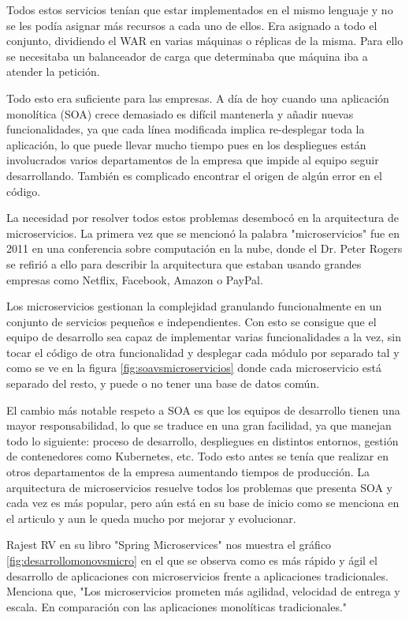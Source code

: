 \documentclass[12pt]{report} %
\begin{document}
Todos estos servicios tenían que estar implementados en el mismo lenguaje y no se les podía asignar más recursos a cada uno de ellos. Era asignado a todo el conjunto, dividiendo el WAR en varias máquinas o réplicas de la misma. Para ello se necesitaba un balanceador de carga que determinaba que máquina iba a atender la petición.


Todo esto era suficiente para las empresas. A día de hoy cuando una aplicación monolítica (SOA) crece demasiado es difícil mantenerla y añadir nuevas funcionalidades, ya que cada línea modificada implica re-desplegar toda la aplicación, lo que puede llevar mucho tiempo pues en los despliegues están involucrados varios departamentos de la empresa que impide al equipo seguir desarrollando. También es complicado encontrar el origen de algún error en el código.

La necesidad por resolver todos estos problemas desembocó en la arquitectura de microservicios. La primera vez que se mencionó la palabra "microservicios" fue en 2011 en una conferencia sobre computación en la nube, donde el Dr. Peter Rogers\cite{breveHistoria} se refirió a ello para describir la arquitectura que estaban usando grandes empresas como Netflix, Facebook, Amazon o PayPal. 

Los microservicios gestionan la complejidad granulando funcionalmente en un conjunto de servicios pequeños e independientes. Con esto se consigue que el equipo de desarrollo sea capaz de implementar varias funcionalidades a la vez, sin tocar el código de otra  funcionalidad y desplegar cada módulo por separado tal y como se ve en la figura \ref{fig:soavsmicroservicios} donde cada microservicio está separado del resto, y puede o no tener una base de datos común.

El cambio más notable respeto a SOA es que los equipos de desarrollo tienen una mayor responsabilidad, lo que se traduce en una gran facilidad, ya que manejan todo lo siguiente:  proceso de desarrollo, despliegues en distintos entornos, gestión de contenedores como Kubernetes, etc. Todo esto antes se tenía que realizar en otros departamentos de la empresa aumentando tiempos de producción. La arquitectura de microservicios resuelve todos los problemas que presenta SOA y cada vez es más popular, pero aún está en su base de inicio como se menciona en el articulo\cite{Dragoni2017} y aun le queda mucho por mejorar y evolucionar.
 
 
 
Rajest RV en su libro "Spring Microservices"\cite{rv2016spring} nos muestra el gráfico \ref{fig:desarrollomonovsmicro} en el que se observa como es más rápido y ágil el desarrollo de aplicaciones con microservicios frente a aplicaciones tradicionales. Menciona que, "Los microservicios prometen más agilidad, velocidad de entrega y escala. En comparación con las aplicaciones monolíticas tradicionales." 
\end{document}
